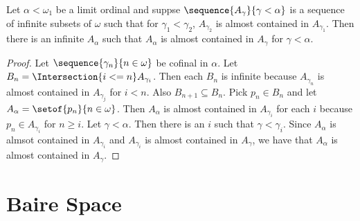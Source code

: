 \documentclass[oneside,12pt]{amsart}
\begin{document}
\begin{lemma}
Let $\alpha < \omega_1$ be a limit ordinal and suppse $\sequence{A_{\gamma}}{\gamma < \alpha}$ is a sequence of infinite
subsets of $\omega$ such that for $\gamma_1 < \gamma_2$, $A_{\gamma_2}$ is almost contained in
$A_{\gamma_1}$. Then there is an infinite $A_{\alpha}$ such that $A_{\alpha}$ is almost contained
in $A_{\gamma}$ for $\gamma<\alpha$.
\end{lemma}
\begin{proof}
Let $\sequence{\gamma_n}{n \in \omega}$ be cofinal in $\alpha$. Let $B_n = \Intersection{i<=n} A_{\gamma_i}$.
Then each $B_n$ is infinite because $A_{\gamma_n}$ is almost contained in $A_{\gamma_j}$ for $i<n$. Also $B_{n+1} \subseteq B_n$.
Pick $p_n \in B_n$ and let $A_{\alpha} = \setof{p_n}{n\in\omega}$. Then $A_{\alpha}$ is almost contained in $A_{\gamma_i}$ for each
$i$ because $p_n \in A_{\gamma_i}$ for $n \geq i$. Let $\gamma < \alpha$. Then there is an $i$ such that $\gamma < \gamma_i$.
Since $A_{\alpha}$ is almsot contained in $A_{\gamma_i}$ and $A_{\gamma_i}$ is almost contained in $A_{\gamma}$, we have that
$A_{\alpha}$ is almost contained in $A_{\gamma}$.
\end{proof}

\section{Baire Space}
\end{document}

